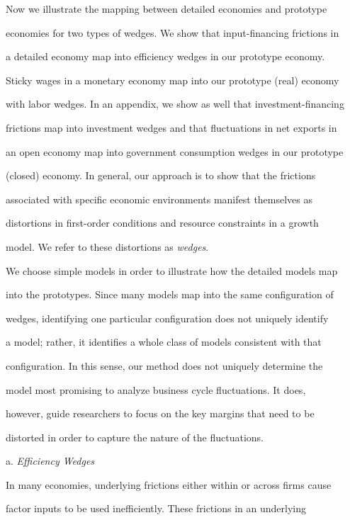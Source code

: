\documentclass[fleqn,leqno,11pt]{article}
\begin{document}
Now we illustrate the mapping between detailed economies and prototype

economies for two types of wedges. We show that input-financing frictions in

a detailed economy map into efficiency wedges in our prototype economy.

Sticky wages in a monetary economy map into our prototype (real) economy

with labor wedges. In an appendix, we show as well that investment-financing

frictions map into investment wedges and that fluctuations in net exports in

an open economy map into government consumption wedges in our prototype

(closed) economy. In general, our approach is to show that the frictions

associated with specific economic environments manifest themselves as

distortions in first-order conditions and resource constraints in a growth

model. We refer to these distortions as \emph{wedges}.



We choose simple models in order to illustrate how the detailed models map

into the prototypes. Since many models map into the same configuration of

wedges, identifying one particular configuration does not uniquely identify

a model; rather, it identifies a whole class of models consistent with that

configuration. In this sense, our method does not uniquely determine the

model most promising to analyze business cycle fluctuations. It does,

however, guide researchers to focus on the key margins that need to be

distorted in order to capture the nature of the fluctuations.



\bigskip \newpage



\noindent a. \emph{Efficiency Wedges}



In many economies, underlying frictions either within or across firms cause

factor inputs to be used inefficiently. These frictions in an underlying
\end{document}
